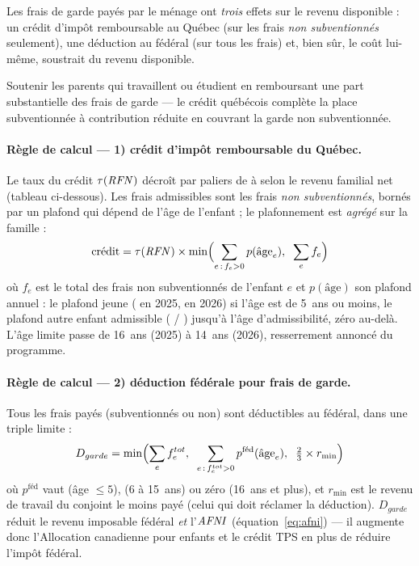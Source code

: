 
\pdesc Les frais de garde payés par le ménage ont \emph{trois} effets sur le
revenu disponible : un crédit d'impôt remboursable au Québec (sur les frais
\emph{non subventionnés} seulement), une déduction au fédéral (sur tous les
frais) et, bien sûr, le coût lui-même, soustrait du revenu disponible.

\pobj Soutenir les parents qui travaillent ou étudient en remboursant une
part substantielle des frais de garde --- le crédit québécois complète la
place subventionnée à contribution réduite en couvrant la garde non
subventionnée.

\paragraph{Règle de calcul --- 1) crédit d'impôt remboursable du Québec.}
Le taux du crédit
$\tau(\mathit{RFN})$ décroît par paliers de  à  selon le revenu
familial net (tableau ci-dessous). Les frais admissibles sont les frais
\emph{non subventionnés}, bornés par un plafond qui dépend de l'âge de
l'enfant ; le plafonnement est \emph{agrégé} sur la famille :
\[
\text{crédit} = \tau(\mathit{RFN}) \times
\min\Bigl(\sum_{e \,:\, f_e > 0} p(\text{âge}_e),\;\; \sum_e f_e\Bigr)
\]
où $f_e$ est le total des frais non subventionnés de l'enfant $e$ et
$p(\text{âge})$ son plafond annuel : le plafond \og jeune \fg{}
( en 2025,  en 2026) si l'âge est de 5~ans ou moins, le
plafond \og autre enfant admissible \fg{} ( / ) jusqu'à
l'âge d'admissibilité, zéro au-delà. L'âge limite passe de 16~ans (2025) à
14~ans (2026), resserrement annoncé du programme.

\paragraph{Règle de calcul --- 2) déduction fédérale pour frais de garde.}
Tous les frais payés (subventionnés ou non) sont déductibles au fédéral,
dans une triple limite :
\[
D_{garde} = \min\Bigl(\sum_e f_e^{tot},\;\;
\sum_{e \,:\, f^{tot}_e > 0} p^{\text{féd}}(\text{âge}_e),\;\;
\tfrac{2}{3} \times r_{\min}\Bigr)
\]
où $p^{\text{féd}}$ vaut  (âge $\le 5$),  (6 à 15~ans) ou zéro
(16~ans et plus), et $r_{\min}$ est le revenu de travail du conjoint le
moins payé (celui qui doit réclamer la déduction). $D_{garde}$ réduit le
revenu imposable fédéral \emph{et} l'$\mathit{AFNI}$
(équation~\ref{eq:afni}) --- il augmente donc l'Allocation canadienne pour
enfants et le crédit TPS en plus de réduire l'impôt fédéral.

